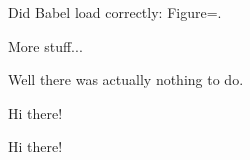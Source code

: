 \documentclass[11pt,a4paper]{article}
\begin{document}
Did Babel load correctly: Figure=\figurename.
\fi




More stuff...

\begin{solution}
  Well there was actually nothing to do.
\end{solution}


Hi there!


Hi there!
\end{document}
